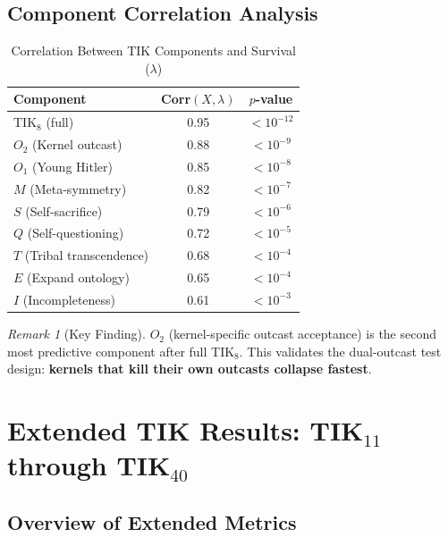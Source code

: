 \documentclass[11pt,a4paper]{article}
\theoremstyle{definition}
\theoremstyle{remark}
\newtheorem{remark}{Remark}
\begin{document}
\subsection{Component Correlation Analysis}

\begin{table}[H]
\centering
\caption{Correlation Between TIK Components and Survival ($\lambda$)}
\label{tab:component-correlation}
\begin{tabular}{@{}lcc@{}}
\toprule
\textbf{Component} & \textbf{Corr$(X, \lambda)$} & \textbf{$p$-value} \\
\midrule
TIK$_8$ (full) & 0.95 & $< 10^{-12}$ \\
$O_2$ (Kernel outcast) & 0.88 & $< 10^{-9}$ \\
$O_1$ (Young Hitler) & 0.85 & $< 10^{-8}$ \\
$M$ (Meta-symmetry) & 0.82 & $< 10^{-7}$ \\
$S$ (Self-sacrifice) & 0.79 & $< 10^{-6}$ \\
$Q$ (Self-questioning) & 0.72 & $< 10^{-5}$ \\
$T$ (Tribal transcendence) & 0.68 & $< 10^{-4}$ \\
$E$ (Expand ontology) & 0.65 & $< 10^{-4}$ \\
$I$ (Incompleteness) & 0.61 & $< 10^{-3}$ \\
\bottomrule
\end{tabular}
\end{table}

\begin{remark}[Key Finding]
$O_2$ (kernel-specific outcast acceptance) is the second most predictive component after full TIK$_8$. This validates the dual-outcast test design: \textbf{kernels that kill their own outcasts collapse fastest}.
\end{remark}

\newpage

\section{Extended TIK Results: TIK$_{11}$ through TIK$_{40}$}

\subsection{Overview of Extended Metrics}
\end{document}
